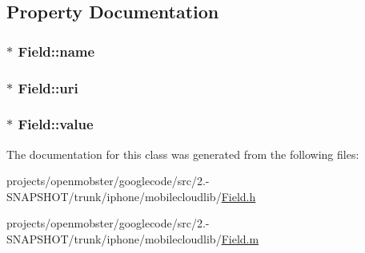 \subsection{\-Property \-Documentation}
\hypertarget{interface_field_ae019697dbae6077ad6f11e2b8aa32b7a}{
\subsubsection[{name}]{ $\ast$ \-Field\-::name}}
\label{interface_field_ae019697dbae6077ad6f11e2b8aa32b7a}
\hypertarget{interface_field_a5f4eb4c4b330ca322fe03ad691c9aa2e}{
\subsubsection[{uri}]{ $\ast$ \-Field\-::uri}}
\label{interface_field_a5f4eb4c4b330ca322fe03ad691c9aa2e}
\hypertarget{interface_field_a2e6db10b66c8a1586a6cf24847434456}{
\subsubsection[{value}]{ $\ast$ \-Field\-::value}}
\label{interface_field_a2e6db10b66c8a1586a6cf24847434456}


\-The documentation for this class was generated from the following files\-:\begin{DoxyCompactItemize}
\item 
projects/openmobster/googlecode/src/2.-\/\-S\-N\-A\-P\-S\-H\-O\-T/trunk/iphone/mobilecloudlib/\hyperlink{_field_8h}{\-Field.\-h}\item 
projects/openmobster/googlecode/src/2.-\/\-S\-N\-A\-P\-S\-H\-O\-T/trunk/iphone/mobilecloudlib/\hyperlink{_field_8m}{\-Field.\-m}\end{DoxyCompactItemize}
